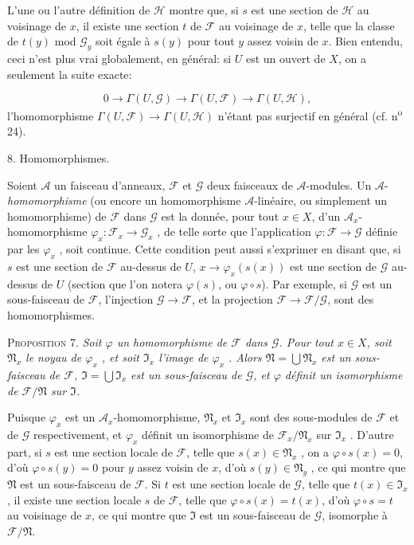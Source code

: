 L'une ou l'autre définition de $\mathcal{H}$ montre que, si $s$ est une section de $\mathcal{H}$ au voisinage de $x$, il existe une section $t$ de $\mathcal{F}$ au voisinage de $x$, telle que la classe de $t(y)$ mod $\mathcal{G}_y$ soit égale à $s(y)$ pour tout $y$ assez voisin de $x$. Bien entendu, ceci n'est plus vrai globalement, en général: si $U$ est un ouvert de $X$, on a seulement la suite exacte:

\begin{equation*}
0 \to \Gamma(U, \mathcal{G}) \to \Gamma(U, \mathcal{F}) \to \Gamma(U, \mathcal{H}),
\end{equation*}
l'homomorphisme $\Gamma(U, \mathcal{F}) \to \Gamma(U, \mathcal{H})$ n'étant pas surjectif en général (cf. n\textsuperscript{o} 24).


8. Homomorphismes.

Soient $\mathcal{A}$ un faisceau d'anneaux, $\mathcal{F}$ et $\mathcal{G}$ deux faisceaux de $\mathcal{A}$-modules. Un $\mathcal{A}$-\emph{homomorphisme} (ou encore un homomorphisme $\mathcal{A}$-linéaire, ou simplement un homomorphisme) de $\mathcal{F}$ dans $\mathcal{G}$ est la donnée, pour tout $x \in X$, d'un $\mathcal{A}_x$-homomorphisme $\varphi_x : \mathcal{F}_x \to \mathcal{G}_x$ , de telle sorte que l'application $\varphi : \mathcal{F} \to \mathcal{G}$ définie par les $\varphi_x$ , soit continue. Cette condition peut aussi s'exprimer en disant que, si $s$ est une section de $\mathcal{F}$ au-dessus de $U$, $x \to \varphi_x(s(x))$ est une section de $\mathcal{G}$ au-dessus de $U$ (section que l'on notera $\varphi(s)$, ou $\varphi \circ s$). Par exemple, si $\mathcal{G}$ est un sous-faisceau de $\mathcal{F}$, l'injection $\mathcal{G} \to \mathcal{F}$, et la projection $\mathcal{F} \to \mathcal{F}/\mathcal{G}$, sont des homomorphismes.

\textsc{Proposition} 7. \emph{Soit $\varphi$ un homomorphisme de $\mathcal{F}$ dans $\mathcal{G}$. Pour tout $x \in X$, soit $\mathfrak{N}_x$ le noyau de $\varphi_x$ , et soit $\mathfrak{I}_x$ l'image de $\varphi_x$ . Alors $\mathfrak{N} = \bigcup \mathfrak{N}_x$ est un sous-faisceau de $\mathcal{F}$, $\mathfrak{I} = \bigcup \mathfrak{I}_x$ est un sous-faisceau de $\mathcal{G}$, et $\varphi$ définit un isomorphisme de $\mathcal{F}/\mathfrak{N}$ sur $\mathfrak{I}$.}

Puisque $\varphi_x$ est un $\mathcal{A}_x$-homomorphisme, $\mathfrak{N}_x$ et $\mathfrak{I}_x$ sont des sous-modules de $\mathcal{F}$ et de $\mathcal{G}$ respectivement, et $\varphi_x$ définit un isomorphisme de $\mathcal{F}_x/\mathfrak{N}_x$ sur $\mathfrak{I}_x$ . D'autre part, si $s$ est une section locale de $\mathcal{F}$, telle que $s(x) \in \mathfrak{N}_x$ , on a $\varphi \circ s(x) = 0$, d'où $\varphi \circ s(y) = 0$ pour $y$ assez voisin de $x$, d'où $s(y) \in \mathfrak{N}_y$ , ce qui montre que $\mathfrak{N}$ est un sous-faisceau de $\mathcal{F}$. Si $t$ est une section locale de $\mathcal{G}$, telle que $t(x) \in \mathfrak{I}_x$ , il existe une section locale $s$ de $\mathcal{F}$, telle que $\varphi \circ s(x) = t(x)$, d'où $\varphi \circ s = t$ au voisinage de $x$, ce qui montre que $\mathfrak{I}$ est un sous-faisceau de $\mathcal{G}$, isomorphe à $\mathcal{F}/\mathfrak{N}$.

